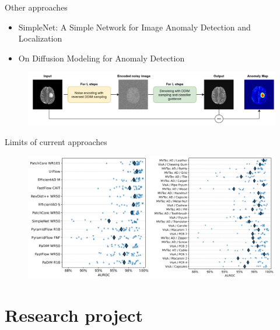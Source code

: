 \documentclass[xcolor=pdftex,dvipsnames,table,mathserif]{beamer}
\begin{document}
\begin{frame}{Other approaches}

\begin{itemize}
\item SimpleNet: A Simple Network for Image Anomaly Detection and Localization~\cite{liu_simplenet_2023}
\item On Diffusion Modeling for Anomaly Detection~\cite{livernoche_diffusion_2023}
\end{itemize}

  \begin{figure}[ht]
    \centering
    \includegraphics[width=\textwidth]{2022.miccai.wolleb}
    \cite{wolleb_diffusion_2022}
  \end{figure}


\end{frame}

\begin{frame}{Limits of current approaches}

  \begin{figure}[ht]
    \centering
    \includegraphics[width=\textwidth]{auroc_per_base_per_method}
  \end{figure}


\end{frame}




\section{Research project}
\end{document}
